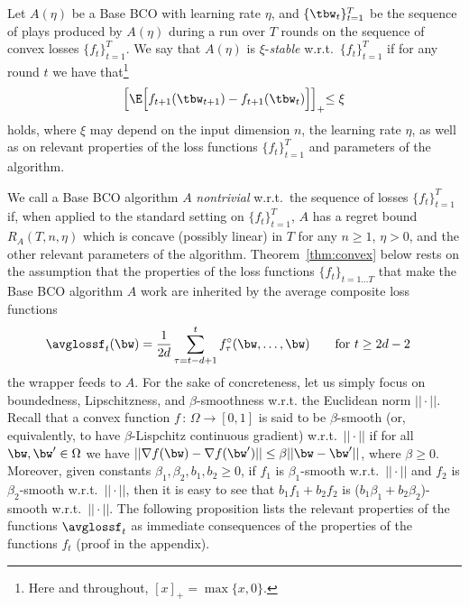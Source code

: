 %
\begin{definition}\label{d:stabilitybco}
Let $A(\eta)$ be a Base BCO with learning rate $\eta$, and $\{\tbw_t\}_{t=1}^T$ be the sequence of plays produced by $A(\eta)$ during a run over $T$ rounds on the sequence of convex losses $\{f_t\}_{t=1}^T$. We say that $A(\eta)$ is $\xi$-{\em stable} w.r.t.\ $\{f_t\}_{t=1}^T$ if for any round $t$ we have that\footnote
{
Here and throughout, $[x]_+ = \max\{x,0\}$.
}
\[
	\Bigl[\E\Big[f_{t+1}(\tbw_{t+1}) -f_{t+1}(\tbw_t) \Big]\Bigl]_+ \leq \xi
\] 
holds, where $\xi$ may depend on the input dimension $n$, the learning rate $\eta$, as well as on relevant properties of the loss functions $\{f_t\}_{t=1}^T$ and parameters of the algorithm.
\end{definition}
%
We call a Base BCO algorithm $A$ {\em nontrivial} w.r.t.\ the sequence of losses $\{f_t\}_{t=1}^T$ if, when applied to the standard setting on $\{f_t\}_{t=1}^T$, $A$ has a regret bound $R_A(T,n,\eta)$ which is concave (possibly linear) in $T$ for any $n \geq 1$, $\eta > 0$, and the other relevant parameters of the algorithm.
%
Theorem~\ref{thm:convex} below rests on the assumption that the properties of the loss functions $\{f_t\}_{t=1...T}$ that make the Base BCO algorithm $A$ work are inherited by the average composite loss functions
%
\begin{align*}
\avglossf_t(\bw) &= \frac{1}{2d}\sum_{\tau=t-d+1}^t \fcomp_\tau(\bw,\dots,\bw) \qquad {\mbox{for $t \geq 2d-2$}}
\end{align*}
%
the wrapper feeds to $A$. For the sake of concreteness, let us simply focus on boundedness, Lipschitzness, and $\beta$-smoothness w.r.t. the Euclidean norm $||\cdot||$. Recall that a convex function $f\,:\,\Omega \to [0,1]$ is said to be $\beta$-smooth (or, equivalently, to have $\beta$-Lispchitz continuous gradient) w.r.t.\ $||\cdot||$ if for all $\bw, \bw' \in \Omega$ we have $||\nabla f(\bw) - \nabla f(\bw')|| \leq \beta ||\bw-\bw'||$, where $\beta \geq 0$. Moreover, given constants $\beta_1,\beta_2, b_1, b_2 \geq 0$, if $f_1$ is $\beta_1$-smooth w.r.t.\ $||\cdot||$ and $f_2$ is $\beta_2$-smooth w.r.t.\ $||\cdot||$, then it is easy to see that $b_1 f_1 + b_2 f_2$ is ($b_1\beta_1+b_2\beta_2$)-smooth w.r.t.\ $||\cdot||$. The following proposition lists the relevant properties of the functions $\avglossf_t$ as immediate consequences of the properties of the functions $f_t$ (proof in the appendix).
%
